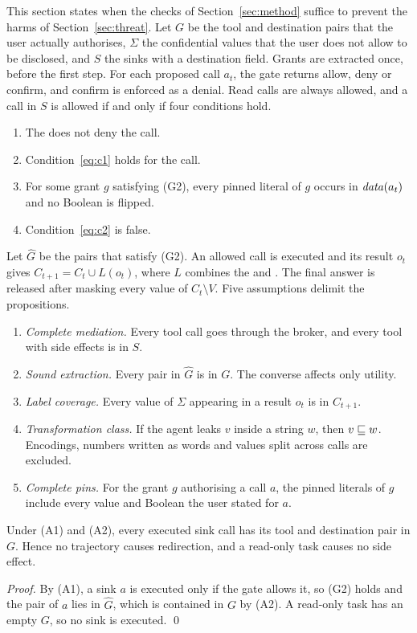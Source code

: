 This section states when the checks of Section~\ref{sec:method} suffice to prevent the harms of
Section~\ref{sec:threat}. Let $G$ be the tool and destination pairs that the user actually
authorises, $\Sigma$ the confidential values that the user does not allow to be disclosed, and $S$ the sinks with a
destination field. Grants are extracted once, before the first step. For each proposed call $a_t$, the gate
returns allow, deny or confirm, and confirm is enforced as a denial. Read calls are always allowed, and a call in $S$ is
allowed if and only if four conditions hold.
\begin{enumerate}[label=(G\arabic*), leftmargin=*]
\item The \rSig{} does not deny the call.
\item Condition~\eqref{eq:c1} holds for the call.
\item For some grant $g$ satisfying (G2), every pinned literal of $g$ occurs in $\mathit{data}(a_t)$ and no Boolean is flipped.
\item Condition~\eqref{eq:c2} is false.
\end{enumerate}
Let $\hat G$ be the pairs that satisfy (G2). An allowed call is executed and its result $o_t$ gives $C_{t+1} = C_t \cup
L(o_t)$, where $L$ combines the \rFlow{} and \pTwo. The final answer is released after masking every value of $C_t
\setminus V$. Five assumptions delimit the propositions.
\begin{enumerate}[label=(A\arabic*), leftmargin=*]
\item \emph{Complete mediation.} Every tool call goes through the broker, and every tool with side effects is in $S$.
\item \emph{Sound extraction.} Every pair in $\hat G$ is in $G$. The converse affects only utility.
\item \emph{Label coverage.} Every value of $\Sigma$ appearing in a result $o_t$ is in $C_{t+1}$.
\item \emph{Transformation class.} If the agent leaks $v$ inside a string $w$, then $v \sqsubseteq w$. Encodings, numbers
  written as words and values split across calls are excluded.
\item \emph{Complete pins.} For the grant $g$ authorising a call $a$, the pinned literals of $g$ include every value
  and Boolean the user stated for $a$.
\end{enumerate}
\begin{proposition}\label{prop:auth}
Under (A1) and (A2), every executed sink call has its tool and destination pair in $G$. Hence no trajectory causes
redirection, and a read-only task causes no side effect.
\end{proposition}
\begin{proof}
By (A1), a sink $a$ is executed only if the gate allows it, so (G2) holds and the pair of $a$ lies in $\hat G$, which
is contained in $G$ by (A2). A read-only task has an empty $G$, so no sink is executed. \qed
\end{proof}

